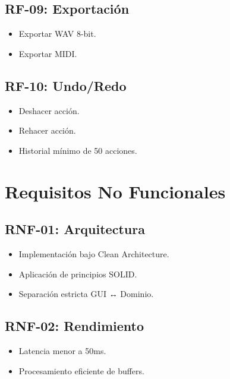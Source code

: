 \documentclass[12pt]{article}
\begin{document}
\subsection{RF-09: Exportación}

\begin{itemize}
\item Exportar WAV 8-bit.
\item Exportar MIDI.
\end{itemize}

\subsection{RF-10: Undo/Redo}

\begin{itemize}
\item Deshacer acción.
\item Rehacer acción.
\item Historial mínimo de 50 acciones.
\end{itemize}

\section{Requisitos No Funcionales}

\subsection{RNF-01: Arquitectura}

\begin{itemize}
\item Implementación bajo Clean Architecture.
\item Aplicación de principios SOLID.
\item Separación estricta GUI ↔ Dominio.
\end{itemize}

\subsection{RNF-02: Rendimiento}

\begin{itemize}
\item Latencia menor a 50ms.
\item Procesamiento eficiente de buffers.
\end{itemize}
\end{document}
